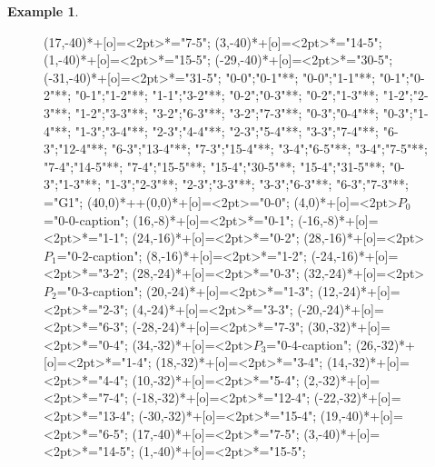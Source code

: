 \documentclass[12pt]{amsart}
\theoremstyle{definition}
\newtheorem{example}{Example}
\begin{document}
\begin{example}
\begin{figure}[H]
{{(17,-40)*+[o]=<2pt>\hbox{\textbullet}*="7-5";
(3,-40)*+[o]=<2pt>\hbox{\textbullet}*="14-5";
(1,-40)*+[o]=<2pt>\hbox{\textbullet}*="15-5";
(-29,-40)*+[o]=<2pt>\hbox{\textbullet}*="30-5";
(-31,-40)*+[o]=<2pt>\hbox{\textbullet}*="31-5";
"0-0";"0-1"**\dir{-};
"0-0";"1-1"**\dir{-};
"0-1";"0-2"**\dir{-};
"0-1";"1-2"**\dir{-};
"1-1";"3-2"**\dir{-};
"0-2";"0-3"**\dir{-};
"0-2";"1-3"**\dir{-};
"1-2";"2-3"**\dir{-};
"1-2";"3-3"**\dir{-};
"3-2";"6-3"**\dir{-};
"3-2";"7-3"**\dir{-};
"0-3";"0-4"**\dir{-};
"0-3";"1-4"**\dir{-};
"1-3";"3-4"**\dir{-};
"2-3";"4-4"**\dir{-};
"2-3";"5-4"**\dir{-};
"3-3";"7-4"**\dir{-};
"6-3";"12-4"**\dir{-};
"6-3";"13-4"**\dir{-};
"7-3";"15-4"**\dir{-};
"3-4";"6-5"**\dir{-};
"3-4";"7-5"**\dir{-};
"7-4";"14-5"**\dir{-};
"7-4";"15-5"**\dir{-};
"15-4";"30-5"**\dir{-};
"15-4";"31-5"**\dir{-};
%
"0-3";"1-3"**;
"1-3";"2-3"**;
"2-3";"3-3"**;
"3-3";"6-3"**;
"6-3";"7-3"**;
\endxy }="G1";
%
%
(40,0)*++{\xy (0,0)*+[o]=<2pt>\cir<2pt>{}="0-0";
%
(4,0)*+[o]=<2pt>\hbox{$P_0$}="0-0-caption";
%
(16,-8)*+[o]=<2pt>\hbox{}*="0-1";
(-16,-8)*+[o]=<2pt>\hbox{}*="1-1";
(24,-16)*+[o]=<2pt>\hbox{}*="0-2";
%
(28,-16)*+[o]=<2pt>\hbox{$P_1$}="0-2-caption";
%
(8,-16)*+[o]=<2pt>\hbox{}*="1-2";
(-24,-16)*+[o]=<2pt>\hbox{}*="3-2";
(28,-24)*+[o]=<2pt>\hbox{}*="0-3";
%
(32,-24)*+[o]=<2pt>\hbox{$P_2$}="0-3-caption";
%
(20,-24)*+[o]=<2pt>\hbox{}*="1-3";
(12,-24)*+[o]=<2pt>\hbox{}*="2-3";
(4,-24)*+[o]=<2pt>\hbox{}*="3-3";
(-20,-24)*+[o]=<2pt>\hbox{}*="6-3";
(-28,-24)*+[o]=<2pt>\hbox{}*="7-3";
(30,-32)*+[o]=<2pt>\hbox{\textbullet}*="0-4";
%
(34,-32)*+[o]=<2pt>\hbox{$P_3$}="0-4-caption";
%
(26,-32)*+[o]=<2pt>\hbox{\textbullet}*="1-4";
(18,-32)*+[o]=<2pt>\hbox{}*="3-4";
(14,-32)*+[o]=<2pt>\hbox{\textbullet}*="4-4";
(10,-32)*+[o]=<2pt>\hbox{\textbullet}*="5-4";
(2,-32)*+[o]=<2pt>\hbox{}*="7-4";
(-18,-32)*+[o]=<2pt>\hbox{\textbullet}*="12-4";
(-22,-32)*+[o]=<2pt>\hbox{\textbullet}*="13-4";
(-30,-32)*+[o]=<2pt>\hbox{}*="15-4";
(19,-40)*+[o]=<2pt>\hbox{\textbullet}*="6-5";
(17,-40)*+[o]=<2pt>\hbox{\textbullet}*="7-5";
(3,-40)*+[o]=<2pt>\hbox{\textbullet}*="14-5";
(1,-40)*+[o]=<2pt>\hbox{\textbullet}*="15-5";
}}
\end{figure}
\end{example}
\end{document}
